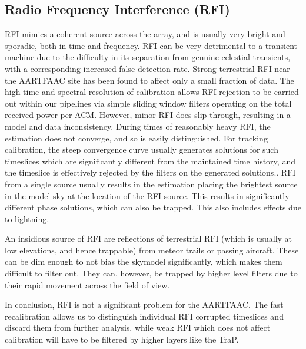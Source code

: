 \documentclass{aa}
\begin{document}
\subsection{Radio Frequency Interference (RFI)}

RFI mimics  a coherent source across the  array, and is usually  very bright and
sporadic, both in time and frequency. RFI can be very detrimental to a transient
machine  due  to  the  difficulty  in  its  separation  from  genuine  celestial
transients,  with  a  corresponding   increased  false  detection  rate.  Strong
terrestrial RFI  near the AARTFAAC  site has been  found to affect only  a small
fraction of  data. The high time  and spectral resolution  of calibration allows
RFI rejection to  be carried out within our pipelines  via simple sliding window
filters operating on the total received  power per ACM.  However, minor RFI does
slip  through, resulting in  a model  and data  inconsistency.  During  times of
reasonably  heavy  RFI, the  estimation  does not  converge,  and  so is  easily
distinguished.  For  tracking calibration,  the steep convergence  curve usually
generates solutions  for such timeslices which are  significantly different from
the maintained  time history, and the  timeslice is effectively  rejected by the
filters on the generated solutions.. RFI from  a single source  usually results in  the estimation
placing the brightest source in the model sky at the location of the RFI source.
This  results in  significantly different  phase  solutions, which  can also  be
trapped. This also includes effects due to lightning.

An insidious source of RFI are  reflections of terrestrial RFI (which is usually
at  low  elevations,  and  hence   trappable)  from  meteor  trails  or  passing
aircraft. These can be dim enough  to not bias the skymodel significantly, which
makes them  difficult to  filter out.  They can, however,  be trapped  by higher
level filters due to their rapid movement across the field of view.

In conclusion,  RFI is  not a  significant problem for  the AARTFAAC.   The fast
recalibration allows  us to distinguish individual RFI  corrupted timeslices and
discard  them  from further  analysis,  while weak  RFI  which  does not  affect
calibration will have to be filtered by higher layers like the TraP.

\end{document}
